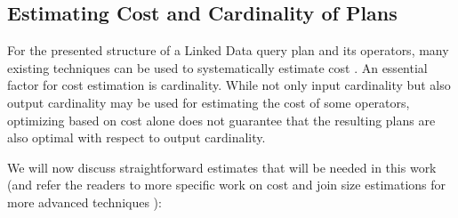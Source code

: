 \subsection{Estimating Cost and Cardinality of Plans}
\label{sec:estimation}
For the presented structure of a Linked Data query plan and its operators, many existing techniques can be used to systematically estimate cost . An essential factor for cost estimation is cardinality. While not only input cardinality but also output cardinality may be used for estimating the cost of some operators, optimizing based on cost alone does not guarantee that the resulting plans are also optimal with respect to output cardinality. 

We will now discuss straightforward estimates that will be needed in this work (and refer the readers to more specific work on cost and join size estimations for more advanced techniques ):

